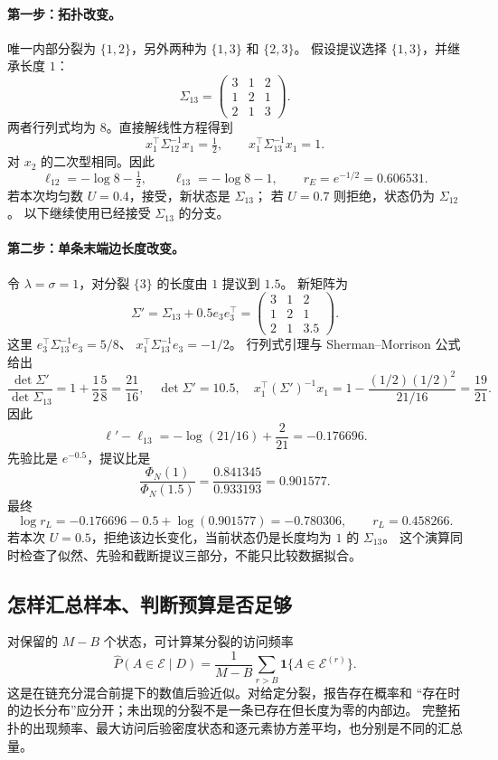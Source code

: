 \documentclass[UTF8,11pt,fontset=fandol,openany,oneside]{ctexbook}
\theoremstyle{definition}
\theoremstyle{remark}
\numberwithin{equation}{chapter}
\begin{document}
\paragraph{第一步：拓扑改变。}
唯一内部分裂为 $\{1,2\}$，另外两种为 $\{1,3\}$ 和 $\{2,3\}$。
假设提议选择 $\{1,3\}$，并继承长度 $1$：
\[
 \Sigma_{13}=
 \begin{pmatrix}3&1&2\\1&2&1\\2&1&3\end{pmatrix}.
\]
两者行列式均为 $8$。直接解线性方程得到
\[
 x_1^\top\Sigma_{12}^{-1}x_1=\tfrac12,\qquad
 x_1^\top\Sigma_{13}^{-1}x_1=1.
\]
对 $x_2$ 的二次型相同。因此
\[
 \ell_{12}=-\log8-\tfrac12,\qquad
 \ell_{13}=-\log8-1,\qquad
 r_E=e^{-1/2}=0.606531.
\]
若本次均匀数 $U=0.4$，接受，新状态是 $\Sigma_{13}$；
若 $U=0.7$ 则拒绝，状态仍为 $\Sigma_{12}$。
以下继续使用已经接受 $\Sigma_{13}$ 的分支。

\paragraph{第二步：单条末端边长度改变。}
令 $\lambda=\sigma=1$，对分裂 $\{3\}$ 的长度由 $1$ 提议到 $1.5$。
新矩阵为
\[
 \Sigma'=\Sigma_{13}+0.5e_3e_3^\top
 =\begin{pmatrix}3&1&2\\1&2&1\\2&1&3.5\end{pmatrix}.
\]
这里
$e_3^\top\Sigma_{13}^{-1}e_3=5/8$、
$x_1^\top\Sigma_{13}^{-1}e_3=-1/2$。
行列式引理与 Sherman--Morrison 公式给出
\[
 \frac{\det\Sigma'}{\det\Sigma_{13}}=
 1+\frac12\frac58=\frac{21}{16},\quad
 \det\Sigma'=10.5,\quad
 x_1^\top(\Sigma')^{-1}x_1=1-\frac{(1/2)(1/2)^2}{21/16}
 =\frac{19}{21}.
\]
因此
\[
 \ell'-\ell_{13}
 =-\log(21/16)+\frac2{21}=-0.176696.
\]
先验比是 $e^{-0.5}$，提议比是
\[
 \frac{\Phi_N(1)}{\Phi_N(1.5)}
 =\frac{0.841345}{0.933193}=0.901577.
\]
最终
\[
 \log r_L=-0.176696-0.5+\log(0.901577)=-0.780306,
 \qquad r_L=0.458266.
\]
若本次 $U=0.5$，拒绝该边长变化，当前状态仍是长度均为 $1$ 的 $\Sigma_{13}$。
这个演算同时检查了似然、先验和截断提议三部分，不能只比较数据拟合。

\subsection{怎样汇总样本、判断预算是否足够}

对保留的 $M-B$ 个状态，可计算某分裂的访问频率
\[
 \widehat P(A\in\mathcal E\mid D)
 =\frac1{M-B}\sum_{r>B}\mathbf1\{A\in\mathcal E^{(r)}\}.
\]
这是在链充分混合前提下的数值后验近似。对给定分裂，报告存在概率和
“存在时的边长分布”应分开；未出现的分裂不是一条已存在但长度为零的内部边。
完整拓扑的出现频率、最大访问后验密度状态和逐元素协方差平均，也分别是不同的汇总量。
\end{document}
